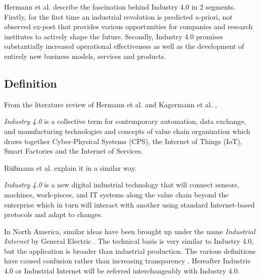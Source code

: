 Hermann et al. \cite{IN4DESIGN} describe the fascination behind Industry 4.0 in 2 segments. Firstly, for the first time an industrial revolution is predicted a-priori, not observed ex-post that provides various opportunities for companies and research institutes to actively shape the future. Secondly, Industry 4.0 promises substantially increased operational effectiveness as well as the development of entirely new business models, services and products.
\subsection{Definition}
From the literature review of Hermann et al. \cite{IN4DESIGN} and Kagermann et al. \cite{VDINACH},
\begin{definition}
\textit{Industry 4.0} is a collective term for contemporary automation, data exchange, and manufacturing technologies and concepts of value chain organization which draws together Cyber-Physical Systems (\acs{CPS}), the Internet of Things (\acs{IoT}), Smart Factories and the Internet of Services. 
\end{definition}
Rüßmann et al. \cite{IN4BCG} explain it in a similar way.
\begin{definition}
\textit{Industry 4.0} is a new digital industrial technology that will connect sensors, machines, work-pieces, and \acs{IT} systems along the value chain beyond the enterprise which in turn will interact with another using standard Internet-based protocols and adapt to changes.
\end{definition}
In North America, similar ideas have been brought up under the name \textit{Industrial Internet} by General Electric \cite{INDUSINTERNET}. The technical basis is very similar to Industry 4.0, but the application is broader than industrial production. The various definitions have caused confusion rather than increasing transparency \cite{IN4HYPE}. Hereafter Industrie 4.0 or Industrial Internet will be referred interchangeably with Industry 4.0.
